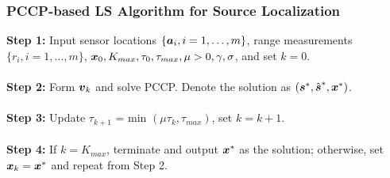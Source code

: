 \begin{frame}
\frametitle{PCCP-based LS Algorithm for Source Localization}
\phantom{m}
\textbf{Step 1:} Input sensor locations $\{\mbox{\boldmath$a$}_i, i = 1,\ldots,m\}$, range measurements $\{r_i, i = 1, \ldots, m\}$, $\mbox{\boldmath$x$}_0, K_{max}, \tau_0, \tau_{max}, \mu > 0, \gamma, \sigma$, and set $k = 0$. 
\\~\\
\textbf{Step 2:} Form  $\mbox{\boldmath$v$}_k$ and solve PCCP. Denote the solution as  $(\mbox{\boldmath$s$}^*, \hat{\mbox{\boldmath$s$}}^*, \mbox{\boldmath$x$}^*)$. 
\\~\\
\textbf{Step 3:} Update  $\tau_{k+1} $ = min $(\mu\tau_k, \tau_{max})$, set $k = k+1$. 
\\~\\
\textbf{Step 4:} If $k = K_{max}$, terminate and output $\mbox{\boldmath$x$}^*$ as the solution; otherwise, set $\mbox{\boldmath$x$}_k = \mbox{\boldmath$x$}^*$ and repeat from Step 2. 
\end{frame}




